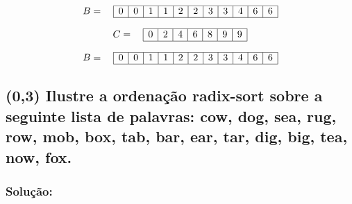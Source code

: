 \documentclass{article}
\begin{document}
\[
B = \quad
\begin{array}{|c|c|c|c|c|c|c|c|c|c|c|}
\hline
0 & 0 & 1 & 
1 & 2 & 2 & 
3 & 3 & 4 & 
6 & 6 \\ 
\hline
\end{array}
\]

\[
C = \quad
\begin{array}{|c|c|c|c|c|c|c|}
\hline
0 & 2 & 4 & 6 & 8 & 9 & 9 \\ 
\hline
\end{array}
\]

\begin{tcolorbox}[title=Resposta, colframe=black, colback=white] %
    \[
    B = \quad
    \begin{array}{|c|c|c|c|c|c|c|c|c|c|c|}
    \hline
    0 & 0 & 1 & 
    1 & 2 & 2 & 
    3 & 3 & 4 & 
    6 & 6 \\ 
    \hline
    \end{array}
    \]
\end{tcolorbox}

\subsection {(0,3) Ilustre a ordenação radix-sort sobre a seguinte lista de palavras: cow, dog, sea,
rug, row, mob, box, tab, bar, ear, tar, dig, big, tea, now, fox.}

\subsubsection{Solução:}
\end{document}
